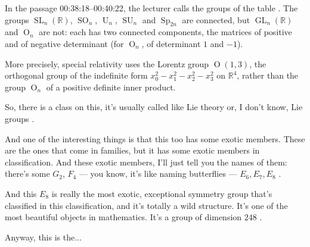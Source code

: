 \begin{aiNote}
In the passage 00:38:18--00:40:22, the lecturer calls the groups of the table . The groups $\operatorname{SL}_n(\mathbb{R})$, $\operatorname{SO}_n$, $\operatorname{U}_n$, $\operatorname{SU}_n$ and $\operatorname{Sp}_{2n}$ are connected, but $\operatorname{GL}_n(\mathbb{R})$ and $\operatorname{O}_n$ are not: each has two connected components, the matrices of positive and of negative determinant (for $\operatorname{O}_n$, of determinant $1$ and $-1$).
\end{aiNote}

\begin{aiNote}
More precisely, special relativity uses the Lorentz group $\operatorname{O}(1, 3)$, the orthogonal group of the indefinite form $x_0^2 - x_1^2 - x_2^2 - x_3^2$ on $\mathbb{R}^4$, rather than the group $\operatorname{O}_n$ of a positive definite inner product.
\end{aiNote}

\begin{hidden}
\end{hidden}

\begin{speech}[00:40:22 - 00:41:13]
So, there is a class on this, it's usually called like Lie theory or, I don't know, Lie groups .

And one of the interesting things is that this too has some exotic members. These are the ones that come in families, but it has some exotic members in classification. And these exotic members, I'll just tell you the names of them: there's some $G_2$, $F_4$ --- you know, it's like naming butterflies --- $E_6, E_7, E_8$ .

And this $E_8$ is really the most exotic, exceptional symmetry group that's classified in this classification, and it's totally a wild structure. It's one of the most beautiful objects in mathematics. It's a group of dimension $248$ .

Anyway, this is the...
\end{speech}

